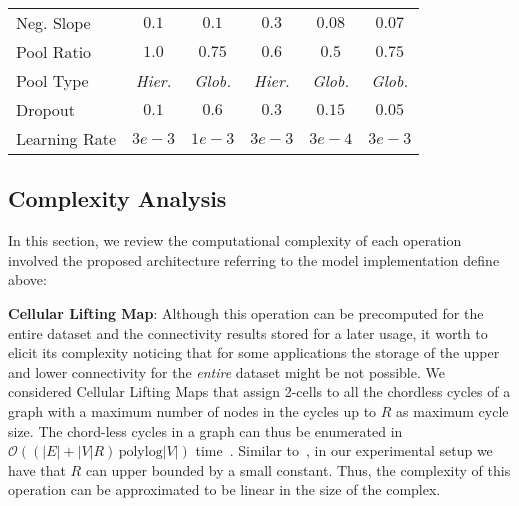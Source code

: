 \documentclass{article}
\begin{document}
\begin{table}[t]
\begin{tabular}{lccccc}
Neg. Slope                & \multicolumn{1}{c}{$0.1$} & \multicolumn{1}{c}{$0.1$} & \multicolumn{1}{c}{$0.3$} & \multicolumn{1}{c}{$0.08$} & \multicolumn{1}{c}{$0.07$}\\
Pool Ratio         & 
\multicolumn{1}{c}{$1.0$} & \multicolumn{1}{c}{$0.75$} & \multicolumn{1}{c}{$0.6$} & \multicolumn{1}{c}{$0.5$} & \multicolumn{1}{c}{$0.75$} \\
Pool Type               & \multicolumn{1}{c}{\textit{Hier.}} & \multicolumn{1}{c}{\textit{Glob.}} & \multicolumn{1}{c}{\textit{Hier.}} & \multicolumn{1}{c}{\textit{Glob.}} & \multicolumn{1}{c}{\textit{Glob.}} \\
Dropout                    & \multicolumn{1}{c}{$0.1$} & \multicolumn{1}{c}{$0.6$} & \multicolumn{1}{c}{$0.3$} & \multicolumn{1}{c}{$0.15$} & \multicolumn{1}{c}{$0.05$}\\
Learning Rate               & \multicolumn{1}{c}{$3e-3$} & \multicolumn{1}{c}{$1e-3$} & \multicolumn{1}{c}{$3e-3$} & \multicolumn{1}{c}{$3e-4$} & \multicolumn{1}{c}{$3e-3$}    \\
\bottomrule
\end{tabular}
\end{table}

\subsection{Complexity Analysis}
In this section, we review the computational complexity of each operation involved the proposed architecture referring to the model implementation define above:


\textbf{Cellular Lifting Map}: Although this operation can be precomputed for the entire dataset and the connectivity results stored for a later usage, it worth to elicit its complexity noticing that for some applications the storage of the upper and lower connectivity for the \emph{entire} dataset might be not possible. We considered Cellular Lifting Maps that assign 2-cells to all the chordless cycles of a graph with a maximum number of nodes in the cycles up to $R$ as maximum cycle size. The chord-less cycles in a graph can thus be enumerated in $\mathcal{O}((|E| + |V| R) \, \textrm{polylog} |V|)$ time~\cite{ferreira14}. Similar to~\cite{bodnarcwnet}, in our experimental setup we have that $R$ can upper bounded by a small constant. Thus, the complexity of this operation can be approximated to be linear in the size of the complex.
\end{document}
